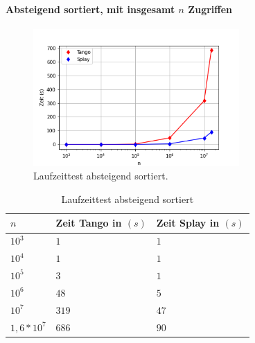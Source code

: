 \documentclass[a4paper,12pt]{article}
\begin{document}
\paragraph{Absteigend sortiert, mit insgesamt $n$ Zugriffen}
\begin{figure}[H]
	\centering
	\includegraphics[width=0.7\textwidth]{"Medien/laufzeittest/diagramm/sorted2"}
	\caption{Laufzeittest absteigend sortiert.}
\end{figure}
\begin{table}[H]
	\begin{center}
		\begin{tabular}[c]{|l|l|l|}
			\hline
			$n$ & Zeit Tango in $\left(s\right)$ &Zeit Splay in $\left(s\right)$ \\
			\hline
			$10^3$ & $1$ &$1$ \\
			\hline
			$10^4$  & $1$ &$1$  \\
			\hline
			$10^5$  & $3$ &$1$  \\
			\hline
			$10^6$  & $48$ &$5$  \\
			\hline
			$10^7$  & $319$ &$47$  \\
			\hline
			$1,6 *10^7$  & $686$ &$90$  \\
			\hline
		\end{tabular}
		\caption{Laufzeittest absteigend sortiert} 
	\end{center}
\end{table}
\end{document}
